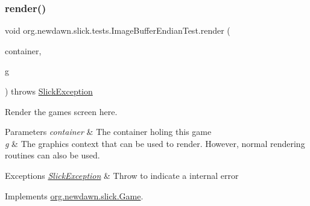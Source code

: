 \subsubsection{\texorpdfstring{render()}{render()}}
{\footnotesize\ttfamily void org.\+newdawn.\+slick.\+tests.\+Image\+Buffer\+Endian\+Test.\+render (\begin{DoxyParamCaption}\item[{\mbox{\hyperlink{classorg_1_1newdawn_1_1slick_1_1_game_container}{Game\+Container}}}]{container,  }\item[{\mbox{\hyperlink{classorg_1_1newdawn_1_1slick_1_1_graphics}{Graphics}}}]{g }\end{DoxyParamCaption}) throws \mbox{\hyperlink{classorg_1_1newdawn_1_1slick_1_1_slick_exception}{Slick\+Exception}}\hspace{0.3cm}{\ttfamily [inline]}}

Render the game\textquotesingle{}s screen here.


\begin{DoxyParams}{Parameters}
{\em container} & The container holing this game \\
\hline
{\em g} & The graphics context that can be used to render. However, normal rendering routines can also be used. \\
\hline
\end{DoxyParams}

\begin{DoxyExceptions}{Exceptions}
{\em \mbox{\hyperlink{classorg_1_1newdawn_1_1slick_1_1_slick_exception}{Slick\+Exception}}} & Throw to indicate a internal error \\
\hline
\end{DoxyExceptions}


Implements \mbox{\hyperlink{interfaceorg_1_1newdawn_1_1slick_1_1_game_af1a4670d43eb3ba04dfcf55ab1975b64}{org.\+newdawn.\+slick.\+Game}}.


